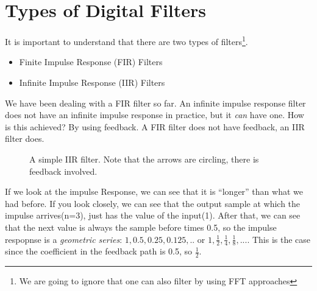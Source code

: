 \section{Types of Digital Filters}

It is important to understand that there are two types of filters\footnote{We are going to ignore that one can also filter by using FFT approaches}. 
\begin{itemize}
	\item Finite Impulse Response (FIR) Filters
	\item Infinite Impulse Response (IIR) Filters
\end{itemize}

We have been dealing with a FIR filter so far. An infinite impulse response filter does not have an infinite impulse response in practice, but it \textit{can} have one. How is this achieved? By using feedback. A FIR filter does not have feedback, an IIR filter does.


\begin{figure}[htb]
  \centering  
  \label{fig:IIRlowpass}

  \caption{A simple IIR filter. Note that the arrows are circling, there is feedback involved.}
\end{figure}


If we look at the impulse Response, we can see that it is  ``longer'' than what we had before. If you look closely, we can see that the output sample at which the impulse arrives(n=3), just has the value of the input(1). After that, we can see that the next value is always the sample before times 0.5, so the impulse respopnse is a \textit{geometric series}: ${1,0.5,0.25,0.125,..}$ or ${1, \frac{1}{2}, \frac{1}{4}, \frac{1}{8}, ...}$. This is the case since the coefficient in the feedback path is 0.5, so $\frac{1}{2}$. 


